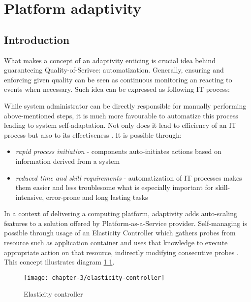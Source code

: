 \chapter{Platform adaptivity}


\section{Introduction}
What makes a concept of an adaptivity enticing is crucial idea behind guaranteeing Quality-of-Serivce: automatization. Generally, ensuring and enforcing given quality can be seen as continuous monitoring an reacting to events when necessary. Such idea can be expressed as following IT process:

While system administrator can be directly responsible for manually performing above-mentioned steps, it is much more favourable to automatize this process leading to system self-adaptation. Not only does it lead to efficiency of an IT process but also to its effectiveness \cite{IBM06}. It is possible through:
\begin{itemize}
  \item \emph{rapid process initiation} - components auto-initiates actions based on information derived from a system
  \item \emph{reduced time and skill requirements} - automatization of IT processes makes them easier and less troublesome what is especially important for skill-intensive, error-prone and long lasting tasks
\end{itemize}

In a context of delivering a computing platform, adaptivity adds auto-scaling features to a solution offered by Platform-as-a-Service provider. Self-managing is possible through usage of an Elasticity Controller which gathers probes from resource such as application container and uses that knowledge to execute appropriate action on that resource, indirectly modifying consecutive probes \cite{VaRoBu11}. This concept illustrates diagram \ref{ch3:elasticity-controller}.

\begin{figure}[!ht]
  \begin{center}
    \texttt{[image: chapter-3/elasticity-controller]}
  \end{center}
  \caption{Elasticity controller}
  \label{ch3:elasticity-controller}
\end{figure}

